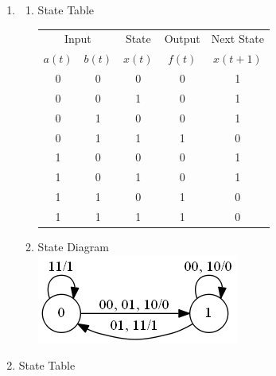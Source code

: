 \documentclass[a4paper]{article}
\begin{document}
\begin{enumerate}
\begin{enumerate}
      \end{enumerate}

      \newpage
      \item 
      \begin{enumerate}

        \item State Table \\

        \begin{tabular}{ccc|c|c}
          \multicolumn{2}{c}{Input} & State & Output & Next State \\
          $a(t)$ & $b(t)$ & $x(t)$ & $f(t)$ & $x(t+1)$ \\ \hline
          0 & 0 & 0 & 0 & 1 \\
          0 & 0 & 1 & 0 & 1 \\
          0 & 1 & 0 & 0 & 1 \\
          0 & 1 & 1 & 1 & 0 \\ \hline
          1 & 0 & 0 & 0 & 1 \\
          1 & 0 & 1 & 0 & 1 \\
          1 & 1 & 0 & 1 & 0 \\
          1 & 1 & 1 & 1 & 0
        \end{tabular}

        \vspace{0.5cm}
        \item State Diagram \\
        \includegraphics[scale=0.5]{6b}

      \end{enumerate}

      \item State Table \\
      

\end{enumerate}
\end{document}

